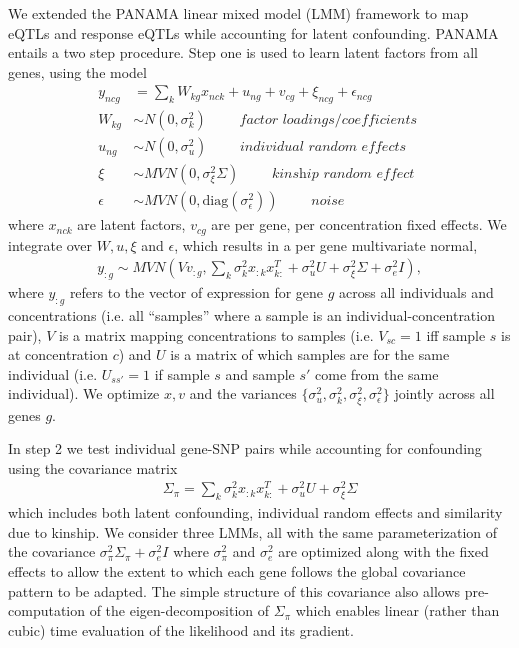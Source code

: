 \documentclass{article}
\begin{document}
{We extended the PANAMA\cite{Fusi2012} linear mixed model (LMM) framework to map eQTLs and response eQTLs while accounting for latent confounding. PANAMA entails a two step procedure. Step one is used to learn latent factors from all genes, using the model
\begin{align*}
y_{ncg} &= \sum_k W_{kg} x_{nck} + u_{ng} + v_{cg} + \xi_{ncg} + \epsilon_{ncg} \\
W_{kg} & \sim N(0, \sigma^2_k ) \qquad \textit{ factor loadings/coefficients } \\ 
u_{ng} &\sim N(0, \sigma^2_u) \qquad \textit{ individual random effects } \\
\xi &\sim MVN(0, \sigma^2_\xi \Sigma ) \qquad \textit{ kinship random effect }  \\
\epsilon &\sim MVN(0, \text{diag}(\sigma^2_\epsilon)) \qquad \textit{ noise } 
\end{align*}
where $x_{nck}$ are latent factors, $v_{cg}$ are per gene, per concentration fixed effects. We integrate over $W, u, \xi$ and $\epsilon$, which results in a per gene multivariate normal,
\begin{align}
y_{:g} \sim MVN\left( V v_{:g} , \sum_k \sigma^2_k x_{:k} x_{k:}^T + \sigma^2_u U + \sigma^2_\xi \Sigma + \sigma^2_e I \right),
\end{align}
where $y_{:g}$ refers to the vector of expression for gene $g$ across all individuals and concentrations (i.e. all ``samples'' where a sample is an individual-concentration pair), $V$ is a matrix mapping concentrations to samples (i.e. $V_{sc}=1$ iff sample $s$ is at concentration $c$) and $U$ is a matrix of which samples are for the same individual (i.e. $U_{ss'}=1$ if sample $s$ and sample $s'$ come from the same individual). We optimize $x,v$ and the variances $\{ \sigma^2_u, \sigma^2_k,  \sigma^2_\xi, \sigma^2_\epsilon \}$ jointly across all genes $g$. 

In step 2 we test individual gene-SNP pairs while accounting for confounding using the covariance matrix 
\begin{align}
 \Sigma_\pi = \sum_k \sigma^2_k x_{:k} x_{k:}^T + \sigma^2_u U + \sigma^2_\xi \Sigma 
 \end{align}
which includes both latent confounding, individual random effects and similarity due to kinship. We consider three LMMs, all with the same parameterization of the covariance $\sigma^2_\pi \Sigma_\pi + \sigma^2_e I$ where $\sigma^2_\pi$ and $\sigma^2_e$ are optimized along with the fixed effects to allow the extent to which each gene follows the global covariance pattern to be adapted. The simple structure of this covariance also allows pre-computation of the eigen-decomposition of $\Sigma_\pi$ which enables linear (rather than cubic) time evaluation of the likelihood and its gradient. 

}
\end{document}
